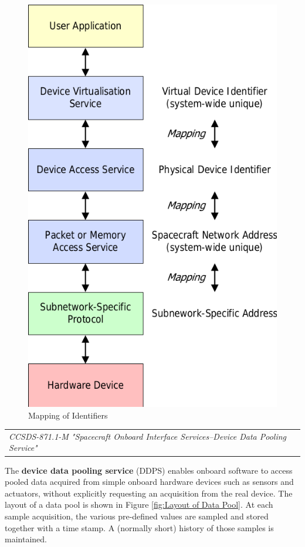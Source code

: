 \begin{figure}[h]
\centering\includegraphics[scale=0.3]{fig/mapping_of_identifiers}
\caption{Mapping of Identifiers}
\label{fig:Mapping of Identifiers}
\end{figure}

\begin{tabular}{l}
\textit{CCSDS-871.1-M "Spacecraft Onboard Interface Services--Device Data Pooling Service" \cite{CCSDS-871.1-M}} 
\end{tabular}

The \textbf{device data pooling service} (DDPS) enables onboard software to access pooled data acquired from simple onboard hardware devices such as sensors and actuators, without explicitly requesting an acquisition from the real device. The layout of a data pool is shown in Figure \ref{fig:Layout of Data Pool}. At each sample acquisition, the various pre-defined values are sampled and stored together with a time stamp. A (normally short) history of those samples is maintained.

